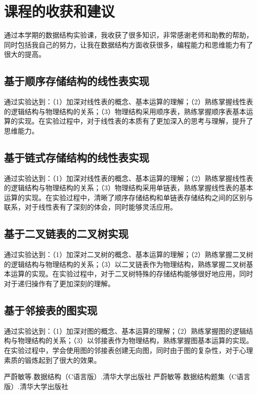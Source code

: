 \documentclass[supercite]{Experimental_Report}
\theoremstyle{definition}
\begin{document}
\newpage

\section{课程的收获和建议}

通过本学期的数据结构实验课，我收获了很多知识，非常感谢老师和助教的帮助，同时包括我自己的努力，让我在数据结构方面收获很多，编程能力和思维能力有了很大的提高。

\subsection{基于顺序存储结构的线性表实现}

通过实验达到：（1）加深对线性表的概念、基本运算的理解；（2）熟练掌握线性表的逻辑结构与物理结构的关系；（3）物理结构采用顺序表，熟练掌握顺序表基本运算的实现。在实验过程中，对于线性表的本质有了更加深入的思考与理解，提升了思维能力。

\subsection{基于链式存储结构的线性表实现}

通过实验达到：（1）加深对线性表的概念、基本运算的理解；（2）熟练掌握线性表的逻辑结构与物理结构的关系；（3）物理结构采用单链表，熟练掌握线性表的基本运算的实现。在实验过程中，清晰了顺序存储结构和单链表存储结构之间的区别与联系，对于线性表有了深刻的体会，同时能够灵活应用。

\subsection{基于二叉链表的二叉树实现}

通过实验达到：（1）加深对二叉树的概念、基本运算的理解；（2）熟练掌握二叉树的逻辑结构与物理结构的关系；（3）以二叉链表作为物理结构，熟练掌握二叉树基本运算的实现。在实验过程中，对于二叉树特殊的存储结构能够很好地应用，同时对于递归操作有了更加深刻的理解。

\subsection{基于邻接表的图实现}

通过实验达到：（1）加深对图的概念、基本运算的理解；（2）熟练掌握图的逻辑结构与物理结构的关系；（3）以邻接表作为物理结构，熟练掌握图基本运算的实现。在实验过程中，学会使用图的邻接表创建无向图，同时由于图的复杂性，对于心理素质的锻炼起到了很大的效果。

\nocite{*} %

\begin{thebibliography}{}
严蔚敏等.数据结构（C语言版）.清华大学出版社
严蔚敏等.数据结构题集（C语言版）.清华大学出版社
\end{thebibliography}
\end{document}
